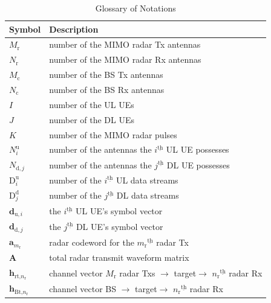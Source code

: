 \documentclass[10pt,journal]{IEEEtran}
\newcommand{\paren}[1]{\left({#1}\right)}
\newcommand{\ith}[1]    {{#1}^{\underline{\text{th}}}}
\newcommand{\rr}{_\mathrm{r}}
\newcommand{\cc}{_\mathrm{c}}
\theoremstyle{definition}
\begin{document}
	\begin{table}[!t]
	\color{red}
		\renewcommand{\arraystretch}{1.3} 
		\caption{Glossary of Notations}
		\label{table_parameter}
		\centering
		\begin{tabular}{l||p{66mm}}
			\hline
			\bfseries Symbol & \bfseries Description\\
			\hline
			$\mathit{M}\rr$& number of the MIMO radar Tx antennas\\
			\hline
			$\mathit{N}\rr$&number of the MIMO radar Rx antennas\\
			\hline
			$\mathit{M}\cc$&number of the BS Tx antennas\\
			\hline 
			$\mathit{N}\cc$&number of the BS Rx antennas\\
			\hline
			$\mathit{I}$& number of the UL UEs\\
			\hline
			$\mathit{J}$& number of the DL UEs\\
			\hline
			$K$&number of the MIMO radar pulses %
			\\
			\hline
			$N^{\textrm{u}}_i$&number of the antennas the $\ith{i}$ UL UE possesses \\
			\hline
			$\mathit{N}_{\mathrm{d},j}$&number of the antennas the $\ith{j}$ DL UE possesses \\
			\hline
			$\mathrm{D}^\textrm{u}_{i}$&number of the $\ith{i}$ UL data streams \\
			\hline
			$\mathrm{D}^\textrm{d}_{j}$&number of the $\ith{j}$ DL data streams\\
			\hline
			$\mathbf{d}_{\mathrm{u},i}$&the $\ith{i}$ UL UE's symbol vector  \\
			\hline
			$\mathbf{d}_{\mathrm{d},j}$&the $\ith{j}$ DL UE's symbol vector \\
			\hline
			$\mathbf{a}_{m\rr}$& radar codeword for the $\ith{m\rr}$ radar Tx\\
			\hline
			$\mathbf{A}$& total radar transmit waveform matrix\\
			\hline
			$\mathbf{h}_{\text{rt,}n\rr}$& channel vector $M\rr$ radar Txs $\rightarrow$ target$\rightarrow$ $\ith{n\rr}$ radar Rx\\
			\hline
			$\mathbf{h}_{\text{Bt,}n\rr}$&  channel vector BS $\rightarrow$ target$\rightarrow$ $\ith{n\rr}$ radar Rx\\

\end{tabular}
\end{table}
\end{document}
